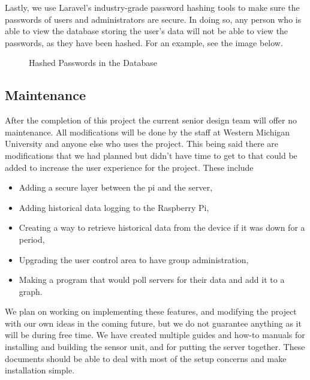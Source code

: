 \documentclass{report}
\begin{document}
\newline
\indent
Lastly, we use Laravel's industry-grade password hashing tools to make sure the passwords of users and administrators are secure. In doing so, any person who is able to view the database storing the user's data will not be able to view the passwords, as they have been hashed. For an example, see the image below.
\begin{figure}[H]
	\caption{Hashed Passwords in the Database}
\end{figure}
\newpage

\subsection*{Maintenance}
\indent
\indent
After the completion of this project the current senior design team will offer no maintenance. All modifications will be done by the staff at Western Michigan University and anyone else who uses the project. This being said there are modifications that we had planned but didn't have time to get to that could be added to increase the user experience for the project. These include
\begin{itemize}
	\item Adding a secure layer between the pi and the server,
	\item Adding historical data logging to the Raspberry Pi,
	\item Creating a way to retrieve historical data from the device if it was down for a period,
	\item Upgrading the user control area to have group administration,
	\item Making a program that would poll servers for their data and add it to a graph.
\end{itemize}
\indent
We plan on working on implementing these features, and modifying the project with our own ideas in the coming future, but we do not guarantee anything as it will be during free time. We have created multiple guides and how-to manuals for installing and building the sensor unit, and for putting the server together. These documents should be able to deal with most of the setup concerns and make installation simple.
\newpage
\end{document}
